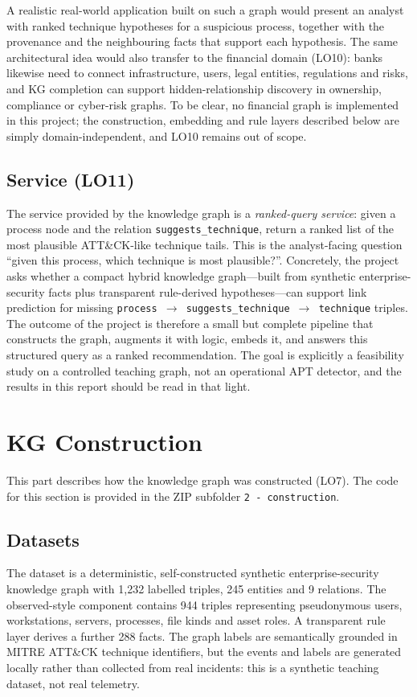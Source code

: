 \documentclass{article}
\begin{document}
A realistic real-world application built on such a graph would present an
analyst with ranked technique hypotheses for a suspicious process, together
with the provenance and the neighbouring facts that support each hypothesis.
The same architectural idea would also transfer to the financial domain
(LO10): banks likewise need to connect infrastructure, users, legal entities,
regulations and risks, and KG completion can support hidden-relationship
discovery in ownership, compliance or cyber-risk graphs. To be clear, no
financial graph is implemented in this project; the construction, embedding
and rule layers described below are simply domain-independent, and LO10
remains out of scope.

\subsection{Service (LO11)}
\label{sec:service}
The service provided by the knowledge graph is a \emph{ranked-query service}:
given a process node and the relation \texttt{suggests\_technique}, return a
ranked list of the most plausible ATT\&CK-like technique tails. This is the
analyst-facing question ``given this process, which technique is most
plausible?''. Concretely, the project asks whether a compact hybrid knowledge
graph---built from synthetic enterprise-security facts plus transparent
rule-derived hypotheses---can support link prediction for missing
\texttt{process $\rightarrow$ suggests\_technique $\rightarrow$ technique}
triples. The outcome of the project is therefore a small but complete pipeline
that constructs the graph, augments it with logic, embeds it, and answers this
structured query as a ranked recommendation. The goal is explicitly a
feasibility study on a controlled teaching graph, not an operational APT
detector, and the results in this report should be read in that light.

\section{KG Construction}
\label{sec:construction}
This part describes how the knowledge graph was constructed (LO7). The code
for this section is provided in the ZIP subfolder \texttt{2 - construction}.

\subsection{Datasets}
\label{sec:datasets}
The dataset is a deterministic, self-constructed synthetic enterprise-security
knowledge graph with 1{,}232 labelled triples, 245 entities and 9 relations.
The observed-style component contains 944 triples representing pseudonymous
users, workstations, servers, processes, file kinds and asset roles. A
transparent rule layer derives a further 288 facts. The graph labels are
semantically grounded in MITRE ATT\&CK technique identifiers, but the events
and labels are generated locally rather than collected from real incidents:
this is a synthetic teaching dataset, not real telemetry.
\end{document}
